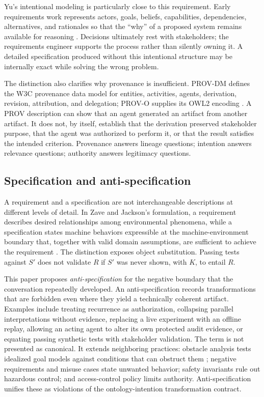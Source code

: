\documentclass[10pt,a4paper]{article}
\begin{document}
Yu's intentional modeling is particularly close to this requirement. Early requirements work represents actors, goals, beliefs, capabilities, dependencies, alternatives, and rationales so that the ``why'' of a proposed system remains available for reasoning \cite{yu1997}. Decisions ultimately rest with stakeholders; the requirements engineer supports the process rather than silently owning it. A detailed specification produced without this intentional structure may be internally exact while solving the wrong problem.

The distinction also clarifies why provenance is insufficient. PROV-DM defines the W3C provenance data model for entities, activities, agents, derivation, revision, attribution, and delegation; PROV-O supplies its OWL2 encoding \cite{provdm2013,provo2013}. A PROV description can show that an agent generated an artifact from another artifact. It does not, by itself, establish that the derivation preserved stakeholder purpose, that the agent was authorized to perform it, or that the result satisfies the intended criterion. Provenance answers lineage questions; intention answers relevance questions; authority answers legitimacy questions.

\subsection{Specification and anti-specification}

A requirement and a specification are not interchangeable descriptions at different levels of detail. In Zave and Jackson's formulation, a requirement describes desired relationships among environmental phenomena, while a specification states machine behaviors expressible at the machine-environment boundary that, together with valid domain assumptions, are sufficient to achieve the requirement \cite{zavejackson1997}. The distinction exposes object substitution. Passing tests against $S'$ does not validate $R$ if $S'$ was never shown, with $K$, to entail $R$.

This paper proposes \emph{anti-specification} for the negative boundary that the conversation repeatedly developed. An anti-specification records transformations that are forbidden even where they yield a technically coherent artifact. Examples include treating recurrence as authorization, collapsing parallel interpretations without evidence, replacing a live experiment with an offline replay, allowing an acting agent to alter its own protected audit evidence, or equating passing synthetic tests with stakeholder validation. The term is not presented as canonical. It extends neighboring practices: obstacle analysis tests idealized goal models against conditions that can obstruct them \cite{vanlamsweerde2000}; negative requirements and misuse cases state unwanted behavior; safety invariants rule out hazardous control; and access-control policy limits authority. Anti-specification unifies these as violations of the ontology-intention transformation contract.
\end{document}
